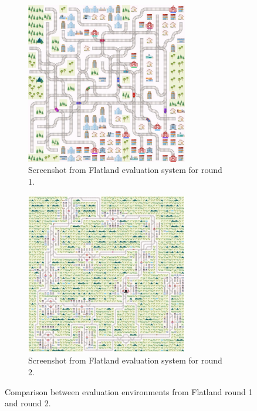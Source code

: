 \begin{figure}[H]
	\centering
	\begin{subfigure}{.5\textwidth}
		\centering
		\includegraphics[width=200pt]{images/example_eval_round1.png}
		\caption{Screenshot from Flatland evaluation system for round 1.}
		\label{fig:eval_round1}
	\end{subfigure}%
	\begin{subfigure}{.5\textwidth}
		\centering
		\includegraphics[width=200pt]{images/example_eval_round2.png}
		\caption{Screenshot from Flatland evaluation system for round 2.}
		\label{fig:eval_round2}
	\end{subfigure}
	\caption{Comparison between evaluation environments from Flatland round 1 and round 2.}
	\label{fig:eval_comp}
\end{figure}




